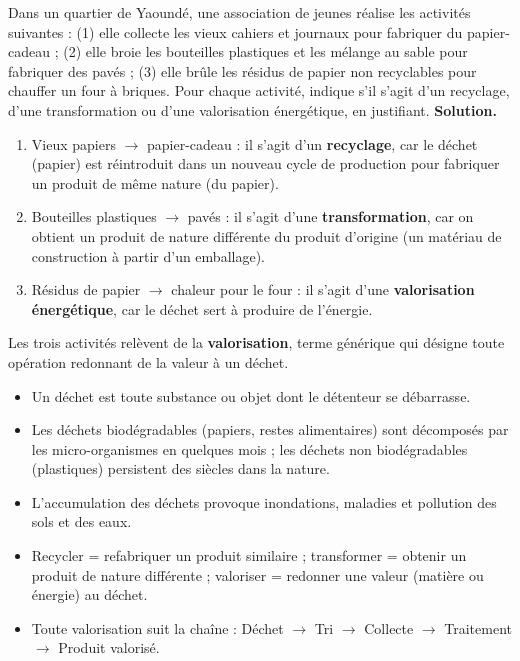 \documentclass[11pt]{article}
\newcommand{\cle}[1]{{\popxbold\color{popdark}#1}}
\begin{document}
\begin{exoresolu}
Dans un quartier de Yaoundé, une association de jeunes réalise les activités suivantes : (1) elle collecte les vieux cahiers et journaux pour fabriquer du papier-cadeau ; (2) elle broie les bouteilles plastiques et les mélange au sable pour fabriquer des pavés ; (3) elle brûle les résidus de papier non recyclables pour chauffer un four à briques. Pour chaque activité, indique s'il s'agit d'un recyclage, d'une transformation ou d'une valorisation énergétique, en justifiant.
\tcblower
\textbf{Solution.}
\begin{enumerate}
\item Vieux papiers $\rightarrow$ papier-cadeau : il s'agit d'un \textbf{recyclage}, car le déchet (papier) est réintroduit dans un nouveau cycle de production pour fabriquer un produit de même nature (du papier).
\item Bouteilles plastiques $\rightarrow$ pavés : il s'agit d'une \textbf{transformation}, car on obtient un produit de nature différente du produit d'origine (un matériau de construction à partir d'un emballage).
\item Résidus de papier $\rightarrow$ chaleur pour le four : il s'agit d'une \textbf{valorisation énergétique}, car le déchet sert à produire de l'énergie.
\end{enumerate}
Les trois activités relèvent de la \textbf{valorisation}, terme générique qui désigne toute opération redonnant de la valeur à un déchet.
\end{exoresolu}

\begin{aretenir}
\begin{itemize}
\item Un \cle{déchet} est toute substance ou objet dont le détenteur se débarrasse.
\item Les déchets \cle{biodégradables} (papiers, restes alimentaires) sont décomposés par les micro-organismes en quelques mois ; les déchets \cle{non biodégradables} (plastiques) persistent des siècles dans la nature.
\item L'accumulation des déchets provoque inondations, maladies et pollution des sols et des eaux.
\item \cle{Recycler} = refabriquer un produit similaire ; \cle{transformer} = obtenir un produit de nature différente ; \cle{valoriser} = redonner une valeur (matière ou énergie) au déchet.
\item Toute valorisation suit la chaîne : Déchet $\rightarrow$ Tri $\rightarrow$ Collecte $\rightarrow$ Traitement $\rightarrow$ Produit valorisé.
\end{itemize}
\end{aretenir}
\end{document}
